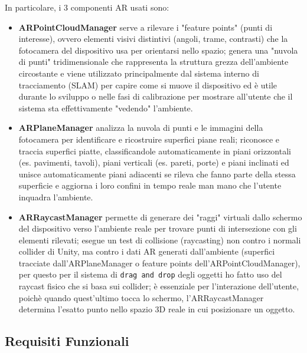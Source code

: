 In particolare, i 3 componenti AR usati sono: 
\begin{itemize}

    \item \textbf{ARPointCloudManager} serve a rilevare i "feature points" (punti di interesse), ovvero elementi visivi distintivi (angoli, trame, contrasti) che la fotocamera del dispositivo usa per orientarsi nello spazio; genera una "nuvola di punti" tridimensionale che rappresenta la struttura grezza dell'ambiente circostante e viene utilizzato principalmente dal sistema interno di tracciamento (SLAM) per capire come si muove il dispositivo ed è utile durante lo sviluppo o nelle fasi di calibrazione per mostrare all'utente che il sistema sta effettivamente "vedendo" l'ambiente.
    
    \item \textbf{ARPlaneManager} analizza la nuvola di punti e le immagini della fotocamera per identificare e ricostruire superfici piane reali; riconosce e traccia superfici piatte, classificandole automaticamente in piani orizzontali (es. pavimenti, tavoli), piani verticali (es. pareti, porte) e piani inclinati ed unisce automaticamente piani adiacenti se rileva che fanno parte della stessa superficie e aggiorna i loro confini in tempo reale man mano che l'utente inquadra l'ambiente. 

    \item \textbf{ARRaycastManager} permette di generare dei "raggi" virtuali dallo schermo del dispositivo verso l'ambiente reale per trovare punti di intersezione con gli elementi rilevati; esegue un test di collisione (raycasting) non contro i normali collider di Unity, ma contro i dati AR generati dall'ambiente (superfici tracciate dall'ARPlaneManager o feature points dell'ARPointCloudManager), per questo per il sistema di \texttt{drag and drop} degli oggetti ho fatto uso del raycast fisico che si basa sui collider; è essenziale per l'interazione dell'utente, poichè quando quest'ultimo tocca lo schermo, l'ARRaycastManager determina l'esatto punto nello spazio 3D reale in cui posizionare un oggetto.

\end{itemize}


\subsection{Requisiti Funzionali}

